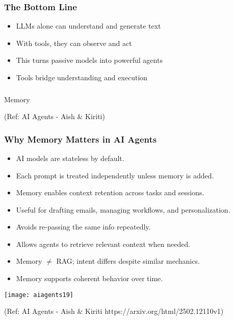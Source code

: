 \begin{frame}[fragile]\frametitle{The Bottom Line}
      \begin{itemize}
        \item LLMs alone can understand and generate text
        \item With tools, they can observe and act
        \item This turns passive models into powerful agents
        \item Tools bridge understanding and execution
      \end{itemize}
\end{frame}

\begin{frame}[fragile]\frametitle{}
\begin{center}
{\Large Memory}

{\tiny (Ref: AI Agents - Aish \& Kiriti)}
\end{center}
\end{frame}

\begin{frame}[fragile]\frametitle{Why Memory Matters in AI Agents}
\begin{itemize}
  \item AI models are stateless by default.
  \item Each prompt is treated independently unless memory is added.
  \item Memory enables context retention across tasks and sessions.
  \item Useful for drafting emails, managing workflows, and personalization.
  \item Avoids re-passing the same info repeatedly.
  \item Allows agents to retrieve relevant context when needed.
  \item Memory $\neq$ RAG; intent differs despite similar mechanics.
  \item Memory supports coherent behavior over time.
\end{itemize}

\begin{center}
\texttt{[image: aiagents19]}

{\tiny (Ref: AI Agents - Aish \& Kiriti https://arxiv.org/html/2502.12110v1)}

\end{center}	
\end{frame}

